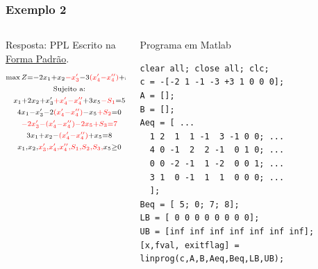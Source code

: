 \begin{frame}[fragile]
	\frametitle{Exemplo 2}
	\begin{columns}
		\begin{column}{0.5\textwidth}
			\begin{exampleblock}{Resposta: PPL Escrito na \underline{Forma Padrão}.}
				\begin{equation*}
					\begin{matrix}
						\scriptstyle \max Z = -2x_1+x_2{\color{red}-x'_3}-3{\color{red}(x'_4 - x''_4)}+x_5 \\
						\scriptstyle \text{Sujeito a:} \\
						\scriptstyle x_1+2x_2{+x'_3}{\color{red}+x'_4 - x''_4}+3x_5 {\color{red}-S_1} = 5 \\
						\scriptstyle 4x_1{-x'_3}-2{\color{red}(x'_4 - x''_4)}-x_5 {\color{red}+S_2} = 0 \\
						\scriptstyle {\color{red}-2{\color{red}x'_3}-{\color{red}(x'_4 - x''_4)}-2x_5 +S_3 = 7} \\
						\scriptstyle 3x_1+x_2-{\color{red}(x'_4 - x''_4)}+x_5 = 8 \\
						\scriptstyle x_1, x_2, {\color{red}x'_3, x'_4, x''_4, S_1, S_2, S_3,} x_5 \ge 0 \\
					\end{matrix}
				\end{equation*}
			\end{exampleblock}
		\end{column}
		\begin{column}{0.5\textwidth}
			\begin{block}{Programa em Matlab}
				\begin{lstlisting}[basicstyle=\tiny]  
clear all; close all; clc;
c = -[-2 1 -1 -3 +3 1 0 0 0];
A = [];
B = [];
Aeq = [ ...
  1 2  1  1 -1  3 -1 0 0; ...
  4 0 -1  2  2 -1  0 1 0; ...
  0 0 -2 -1  1 -2  0 0 1; ...
  3 1  0 -1  1  1  0 0 0; ...
  ];
Beq = [ 5; 0; 7; 8];
LB = [ 0 0 0 0 0 0 0 0]; 
UB = [inf inf inf inf inf inf inf];
[x,fval, exitflag] = linprog(c,A,B,Aeq,Beq,LB,UB);				
				\end{lstlisting}
			\end{block}
		\end{column}
	\end{columns}
\end{frame}

